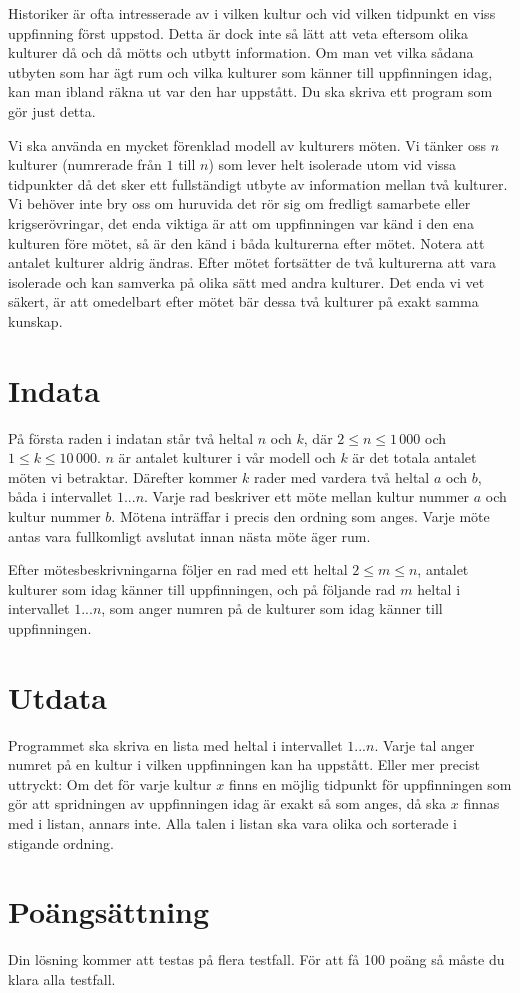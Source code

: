 

Historiker är ofta intresserade av i vilken kultur och vid vilken tidpunkt en viss uppfinning först uppstod. Detta är dock inte så lätt att veta eftersom olika kulturer då och då mötts och utbytt information. Om man vet vilka sådana utbyten som har ägt rum och vilka kulturer som känner till uppfinningen idag, kan man ibland räkna ut var den har uppstått. Du ska skriva ett program som gör just detta.

Vi ska använda en mycket förenklad modell av kulturers möten. Vi tänker oss $n$ kulturer (numrerade från $1$ till $n$) som lever helt isolerade utom vid vissa tidpunkter då det sker ett fullständigt utbyte av information mellan två kulturer. Vi behöver inte bry oss om huruvida det rör sig om fredligt samarbete eller krigserövringar, det enda viktiga är att om uppfinningen var känd i den ena kulturen före mötet, så är den känd i båda kulturerna efter mötet. Notera att antalet kulturer aldrig ändras. Efter mötet fortsätter de två kulturerna att vara isolerade och kan samverka på olika sätt med andra kulturer. Det enda vi vet säkert, är att omedelbart efter mötet bär dessa två kulturer på exakt samma kunskap.

\section*{Indata}
På första raden i indatan står två heltal $n$ och $k$, där $2 \le n \le 1\,000$ och $1 \le k \le 10\,000$. $n$ är antalet kulturer i vår modell och $k$ är det totala antalet möten vi betraktar. Därefter kommer $k$ rader med vardera två heltal $a$ och $b$, båda i intervallet $1...n$. Varje rad beskriver ett möte mellan kultur nummer $a$ och kultur nummer $b$. Mötena inträffar i precis den ordning som anges. Varje möte antas vara fullkomligt avslutat innan nästa möte äger rum.

Efter mötesbeskrivningarna följer en rad med ett heltal $2 \le m \le n$, antalet kulturer som idag känner till uppfinningen, och på följande rad $m$ heltal i intervallet $1...n$, som anger numren på de kulturer som idag känner till uppfinningen.

\section*{Utdata}
Programmet ska skriva en lista med heltal i intervallet $1...n$. Varje tal anger numret på en kultur i vilken uppfinningen kan ha uppstått. Eller mer precist uttryckt: Om det för varje kultur $x$ finns en möjlig tidpunkt för uppfinningen som gör att spridningen av uppfinningen idag är exakt så som anges, då ska $x$ finnas med i listan, annars inte. Alla talen i listan ska vara olika och sorterade i stigande ordning.

\section*{Poängsättning}
Din lösning kommer att testas på flera testfall. För att få 100 poäng så måste du klara alla testfall.
